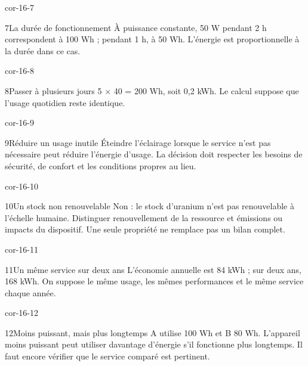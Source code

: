 \documentclass[12pt,twoside,openany]{book}
\begin{document}
\begin{blocLivre}{cor-16-7}
\begin{corrige}{7}{La durée de fonctionnement}
À puissance constante, 50 W pendant 2 h correspondent à 100 Wh ; pendant 1 h, à 50 Wh. L’énergie est proportionnelle à la durée dans ce cas.\par
\end{corrige}\end{blocLivre}
\begin{blocLivre}{cor-16-8}
\begin{corrige}{8}{Passer à plusieurs jours}
5 \(\times\) 40 = 200 Wh, soit 0,2 kWh. Le calcul suppose que l’usage quotidien reste identique.\par
\end{corrige}\end{blocLivre}
\begin{blocLivre}{cor-16-9}
\begin{corrige}{9}{Réduire un usage inutile}
Éteindre l’éclairage lorsque le service n’est pas nécessaire peut réduire l’énergie d’usage. La décision doit respecter les besoins de sécurité, de confort et les conditions propres au lieu.\par
\end{corrige}\end{blocLivre}
\begin{blocLivre}{cor-16-10}
\begin{corrige}{10}{Un stock non renouvelable}
Non : le stock d’uranium n’est pas renouvelable à l’échelle humaine. Distinguer renouvellement de la ressource et émissions ou impacts du dispositif. Une seule propriété ne remplace pas un bilan complet.\par
\end{corrige}\end{blocLivre}
\begin{blocLivre}{cor-16-11}
\begin{corrige}{11}{Un même service sur deux ans}
L’économie annuelle est 84 kWh ; sur deux ans, 168 kWh. On suppose le même usage, les mêmes performances et le même service chaque année.\par
\end{corrige}\end{blocLivre}
\begin{blocLivre}{cor-16-12}
\begin{corrige}{12}{Moins puissant, mais plus longtemps}
A utilise 100 Wh et B 80 Wh. L’appareil moins puissant peut utiliser davantage d’énergie s’il fonctionne plus longtemps. Il faut encore vérifier que le service comparé est pertinent.\par
\end{corrige}\end{blocLivre}
\end{document}
